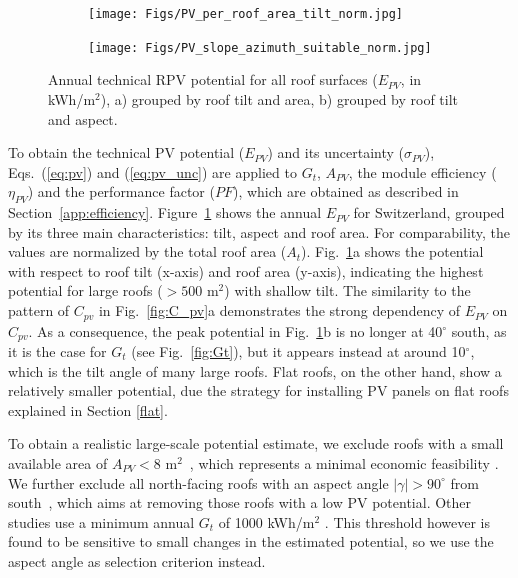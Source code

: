 \begin{figure}[tb]
\centering
\begin{subfigure}{.48\textwidth}
  \centering
  \texttt{[image: Figs/PV\_per\_roof\_area\_tilt\_norm.jpg]} 
  \subcaption{}
\end{subfigure}
\begin{subfigure}{.48\textwidth}
  \centering
  \texttt{[image: Figs/PV\_slope\_azimuth\_suitable\_norm.jpg]}
  \subcaption{}
\end{subfigure}
\caption{Annual technical RPV potential for all roof surfaces ($E_{PV}$, in kWh/m$^2$), a) grouped by roof tilt and area, b) grouped by roof tilt and aspect.}
\label{fig:pv_roof}
\end{figure}

To obtain the technical PV potential ($E_{PV}$) and its uncertainty ($\sigma_{PV}$), Eqs.~(\ref{eq:pv}) and (\ref{eq:pv_unc}) are applied to $G_t$, $A_{PV}$, the module efficiency ($\eta_{PV}$) and the performance factor ($\mathit{PF}$), which are obtained as described in Section~\ref{app:efficiency}.
%
Figure~\ref{fig:pv_roof} shows the annual $E_{PV}$ for Switzerland, grouped by its three main characteristics: tilt, aspect and roof area. For comparability, the values are normalized by the total roof area ($A_t$). 
Fig.~\ref{fig:pv_roof}a shows the potential with respect to roof tilt (x-axis) and roof area (y-axis), indicating the highest potential for large roofs ($> 500$ m$^2$) with shallow tilt. 
The similarity to the pattern of $C_{\mathit{pv}}$ in Fig.~\ref{fig:C_pv}a demonstrates the strong dependency of $E_{PV}$ on $C_{\mathit{pv}}$.
As a consequence, the peak potential in Fig.~\ref{fig:pv_roof}b is no longer at 40$^\circ$ south, as it is the case for $G_t$ (see Fig.~\ref{fig:Gt}), but it appears instead at around 10$^\circ$, which is the tilt angle of many large roofs. 
Flat roofs, on the other hand, show a relatively smaller potential, due the strategy for installing PV panels on flat roofs explained in Section \ref{flat}.

To obtain a realistic large-scale potential estimate, we exclude roofs with a small available area of $A_{PV}<8$ m$^2$~\cite{assouline_large-scale_2018}, which represents a minimal economic feasibility \cite{assouline_quantifying_2017, assouline_large-scale_2018, portmann_sonnendach.ch:_2016, romero_rodriguez_assessment_2017}. 
We further exclude all north-facing roofs with an aspect angle $|\gamma| > 90^\circ$ from south~\cite{assouline_large-scale_2018, assouline_quantifying_2017}, which aims at removing those roofs with a low PV potential. Other studies use a minimum annual $G_t$ of 1000 kWh/m$^2$ \cite{buffat_scalable_2018, portmann_sonnendach.ch:_2016, romero_rodriguez_assessment_2017}. This threshold however is found to be sensitive to small changes in the estimated potential, so we use the aspect angle as selection criterion instead.

